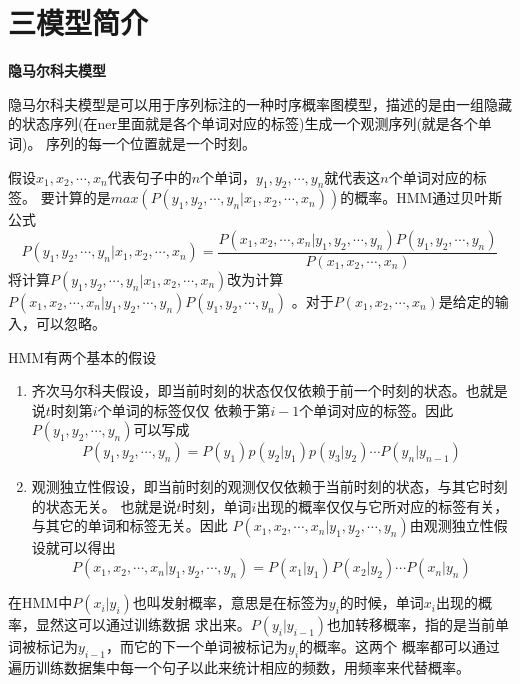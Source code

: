 \documentclass[openany,oneside]{ctexbook}
\begin{document}
\newpage
\chapter{\sihao\hei 三\quad 模型简介}
{\bfseries 隐马尔科夫模型}

隐马尔科夫模型是可以用于序列标注的一种时序概率图模型，描述的是由一组隐藏
的状态序列(在ner里面就是各个单词对应的标签)生成一个观测序列(就是各个单词)。
序列的每一个位置就是一个时刻。

假设$x_1,x_2,\cdots ,x_n$代表句子中的$n$个单词，$y_1,y_2,\cdots, y_n$就代表这$n$个单词对应的标签。
要计算的是$max(P(y_1,y_2,\cdots, y_n|x_1,x_2,\cdots,x_n))$的概率。HMM通过贝叶斯公式
\[
   P(y_1,y_2,\cdots, y_n|x_1,x_2,\cdots,x_n)=\displaystyle\frac{P(x_1,x_2,\cdots ,x_n|y_1,y_2,\cdots, y_n)P(y_1,y_2,\cdots, y_n)}{P(x_1,x_2,\cdots ,x_n)}
\]
将计算$P(y_1,y_2,\cdots, y_n|x_1,x_2,\cdots,x_n)$改为计算$P(x_1,x_2,\cdots ,x_n|y_1,y_2,\cdots, y_n)P(y_1,y_2,\cdots, y_n)$
。对于$P(x_1,x_2,\cdots ,x_n)$是给定的输入，可以忽略。

HMM有两个基本的假设
\begin{enumerate}
   \item 齐次马尔科夫假设，即当前时刻的状态仅仅依赖于前一个时刻的状态。也就是说$t$时刻第$i$个单词的标签仅仅
依赖于第$i-1$个单词对应的标签。因此$P(y_1,y_2,\cdots, y_n)$可以写成
\[
P(y_1,y_2,\cdots, y_n)=P(y_1)p(y_2|y_1)p(y_3|y_2)\cdots P(y_n|y_{n-1})
\]
   \item 观测独立性假设，即当前时刻的观测仅仅依赖于当前时刻的状态，与其它时刻的状态无关。
   也就是说$t$时刻，单词$i$出现的概率仅仅与它所对应的标签有关，与其它的单词和标签无关。因此
   $P(x_1,x_2,\cdots ,x_n|y_1,y_2,\cdots, y_n)$由观测独立性假设就可以得出
   \[
      P(x_1,x_2,\cdots ,x_n|y_1,y_2,\cdots, y_n)=P(x_1|y_1)P(x_2|y_2)\cdots P(x_n|y_n)
   \]

\end{enumerate}

在HMM中$P(x_i|y_i)$也叫发射概率，意思是在标签为$y_i$的时候，单词$x_i$出现的概率，显然这可以通过训练数据
求出来。$P(y_i|y_{i-1})$也加转移概率，指的是当前单词被标记为$y_{i-1}$，而它的下一个单词被标记为$y_i$的概率。这两个
概率都可以通过遍历训练数据集中每一个句子以此来统计相应的频数，用频率来代替概率。
\end{document}
